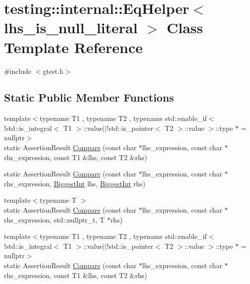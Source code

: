 \hypertarget{classtesting_1_1internal_1_1_eq_helper}{}\section{testing\+::internal\+::Eq\+Helper$<$ lhs\+\_\+is\+\_\+null\+\_\+literal $>$ Class Template Reference}
\label{classtesting_1_1internal_1_1_eq_helper}


{\ttfamily \#include $<$gtest.\+h$>$}

\subsection*{Static Public Member Functions}
\begin{DoxyCompactItemize}
\item 
{\footnotesize template$<$typename T1 , typename T2 , typename std\+::enable\+\_\+if$<$!std\+::is\+\_\+integral$<$ T1 $>$\+::value$\vert$$\vert$!std\+::is\+\_\+pointer$<$ T2 $>$\+::value $>$\+::type $\ast$  = nullptr$>$ }\\static Assertion\+Result \mbox{\hyperlink{classtesting_1_1internal_1_1_eq_helper_a14dd80457029c1ab4a4d04f20003d237}{Compare}} (const char $\ast$lhs\+\_\+expression, const char $\ast$rhs\+\_\+expression, const T1 \&lhs, const T2 \&rhs)
\item 
static Assertion\+Result \mbox{\hyperlink{classtesting_1_1internal_1_1_eq_helper_aaa42c0059bb3dcc43d556243febb5f1c}{Compare}} (const char $\ast$lhs\+\_\+expression, const char $\ast$rhs\+\_\+expression, \mbox{\hyperlink{namespacetesting_1_1internal_a05c6bd9ede5ccdf25191a590d610dcc6}{Biggest\+Int}} lhs, \mbox{\hyperlink{namespacetesting_1_1internal_a05c6bd9ede5ccdf25191a590d610dcc6}{Biggest\+Int}} rhs)
\item 
{\footnotesize template$<$typename T $>$ }\\static Assertion\+Result \mbox{\hyperlink{classtesting_1_1internal_1_1_eq_helper_a2bbb6deaafe1ca824e94c0e20f1d824c}{Compare}} (const char $\ast$lhs\+\_\+expression, const char $\ast$rhs\+\_\+expression, std\+::nullptr\+\_\+t, T $\ast$rhs)
\item 
{\footnotesize template$<$typename T1 , typename T2 , typename std\+::enable\+\_\+if$<$!std\+::is\+\_\+integral$<$ T1 $>$\+::value$\vert$$\vert$!std\+::is\+\_\+pointer$<$ T2 $>$\+::value $>$\+::type $\ast$  = nullptr$>$ }\\static Assertion\+Result \mbox{\hyperlink{classtesting_1_1internal_1_1_eq_helper_a14dd80457029c1ab4a4d04f20003d237}{Compare}} (const char $\ast$lhs\+\_\+expression, const char $\ast$rhs\+\_\+expression, const T1 \&lhs, const T2 \&rhs)

\end{DoxyCompactItemize}
